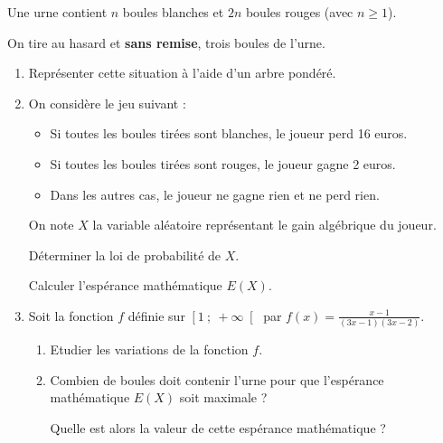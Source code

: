 
%
Une urne contient $n$ boules blanches et $2n$ boules rouges (avec $n \geqslant 1$).
\par
On tire au hasard et \textbf{sans remise}, trois boules de l'urne.
\begin{enumerate}
     \item
     Représenter cette situation à l'aide d'un arbre pondéré.
     \item
     On considère le jeu suivant :
     \begin{itemize}
          \item
          Si toutes les boules tirées sont blanches, le joueur perd 16 euros.
          \item
          Si toutes les boules tirées sont rouges, le joueur gagne 2 euros.
          \item
          Dans les autres cas, le joueur ne gagne rien et ne perd rien.
     \end{itemize}
     On note $X$ la variable aléatoire représentant le gain algébrique du joueur.
     \par
     Déterminer la loi de probabilité de $X$.
     \par
     Calculer l'espérance mathématique $E(X)$.
     \item
     Soit la fonction $f$ définie sur $\left[1~;~+\infty\right[$ par $f(x)=\frac{x-1}{(3x-1)(3x-2)}$.
     \begin{enumerate}
          \item
          Etudier les variations de la fonction $f$.
          \item
          Combien de boules doit contenir l'urne pour que l'espérance mathématique $E(X)$ soit maximale ?
          \par
          Quelle est alors la valeur de cette espérance mathématique ?
     \end{enumerate}
\end{enumerate}
